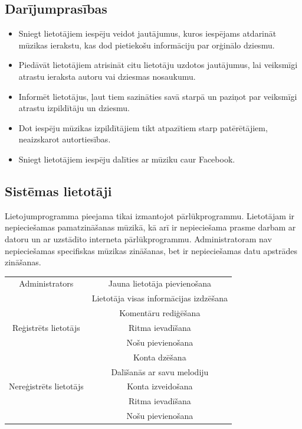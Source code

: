 \documentclass[12pt]{article}
\begin{document}
\subsection{Darījumprasības}
\begin{itemize}
\item Sniegt lietotājiem iespēju veidot jautājumus, kuros iespējams atdarināt mūzikas ierakstu, kas dod pietiekošu informāciju par orģinālo dziesmu.
\item Piedāvāt lietotājiem atrisināt citu lietotāju uzdotos jautājumus, lai veiksmīgi atrastu ieraksta autoru vai dziesmas nosaukumu.
\item Informēt lietotājus, ļaut tiem sazināties savā starpā un paziņot par veiksmīgi atrastu izpildītāju un dziesmu.
\item Dot iespēju mūzikas izpildītājiem tikt atpazītiem starp patērētājiem, neaizskarot autortiesības.
\item Sniegt lietotājiem iespēju dalīties ar mūziku caur Facebook.
\end{itemize}

\subsection{Sistēmas lietotāji}

Lietojumprogramma pieejama tikai izmantojot pārlūkprogrammu. Lietotājam ir nepieciešamas pamatzināšanas mūzikā, kā arī ir nepieciešama prasme darbam ar datoru un ar uzstādīto interneta pārlūkprogrammu. Administratoram nav nepieciešamas specifiskas mūzikas zināšanas, bet ir nepieciešamas datu apstrādes zināšanas.\\

\begin{center}
\begin{tabular}{|c|c|}
\hline
Administrators & Jauna lietotāja pievienošana  \\
& Lietotāja visas informācijas izdzēšana \\
& Komentāru rediģēšana \\
\hline
Reģistrēts lietotājs & Ritma ievadīšana \\
& Nošu pievienošana \\
& Konta dzēšana \\
& Dalīšanās ar savu melodiju\\
\hline
Nereģistrēts lietotājs & Konta izveidošana \\
& Ritma ievadīšana \\
& Nošu pievienošana \\
\hline
\end{tabular}
\end{center}
\end{document}
